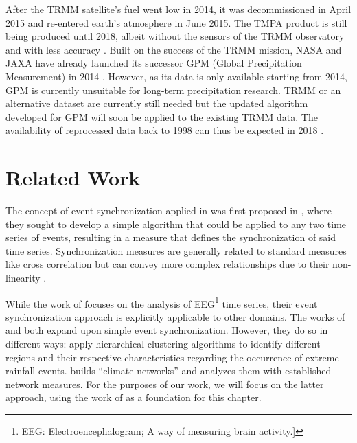 After the TRMM satellite's fuel went low in 2014, it was decommissioned in April 2015 and re-entered earth's atmosphere in June 2015. The TMPA product is still being produced until 2018, albeit without the sensors of the TRMM observatory and with less accuracy \citep{Huffman.2017}. Built on the success of the TRMM mission, NASA and JAXA have already launched its successor GPM (Global Precipitation Measurement) in 2014 \citep{GoddardEarthScienceDataInformationandServicesCenter.2011}. However, as its data is only available starting from 2014, GPM is currently unsuitable for long-term precipitation research. TRMM or an alternative dataset are currently still needed but the updated algorithm developed for GPM will soon be applied to the existing TRMM data. The availability of reprocessed data back to 1998 can thus be expected in 2018 \citep{Huffman.2016}.


\section{Related Work}
The concept of event synchronization applied in \citet{Stolbova.2015} was first proposed in \citet{QuianQuiroga.2002}, where they sought to develop a simple algorithm that could be applied to any two time series of events, resulting in a measure that defines the synchronization of said time series. Synchronization measures are generally related to standard measures like cross correlation but can convey more complex relationships due to their non-linearity \citep{QuianQuiroga.2002}.

While the work of \citet{QuianQuiroga.2002} focuses on the analysis of EEG\footnote{EEG: Electroencephalogram; A way of measuring brain activity.]} time series, their event synchronization approach is explicitly applicable to other domains. The works of \citet{Malik.2010} and \citet{Stolbova.2015} both expand upon simple event synchronization. However, they do so in different ways: \citet{Malik.2010} apply hierarchical clustering algorithms to identify different regions and their respective characteristics regarding the occurrence of extreme rainfall events. \citet{Stolbova.2015} builds ``climate networks'' and analyzes them with established network measures. For the purposes of our work, we will focus on the latter approach, using the work of \citet{Stolbova.2015} as a foundation for this chapter.

